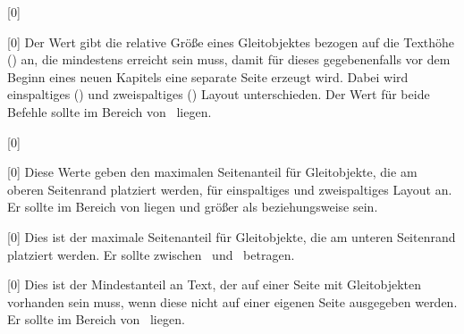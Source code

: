 \begin{Declaration}{}[0\floatpagefraction]
\begin{Declaration}{}[0\dblfloatpagefraction]
\printdeclarationlist*%
%
Der Wert gibt die relative Größe eines Gleitobjektes bezogen auf die Texthöhe 
() an, die mindestens erreicht sein muss, damit für dieses 
gegebenenfalls vor dem Beginn eines neuen Kapitels eine separate Seite erzeugt 
wird. Dabei wird einspaltiges () und zweispaltiges 
() Layout unterschieden. Der Wert für beide 
Befehle sollte im Bereich von~ liegen.
\end{Declaration}
\end{Declaration}

\begin{Declaration}{}[0\topfraction]
\begin{Declaration}{}[0\dbltopfraction]
\printdeclarationlist*%
%
Diese Werte geben den maximalen Seitenanteil für Gleitobjekte, die am oberen 
Seitenrand platziert werden, für einspaltiges und zweispaltiges Layout an. Er 
sollte im Bereich von  liegen und größer als 
 beziehungsweise  sein.
\end{Declaration}
\end{Declaration}

\begin{Declaration}{}[0\bottomfraction]
\printdeclarationlist*%
%
Dies ist der maximale Seitenanteil für Gleitobjekte, die am unteren Seitenrand 
platziert werden. Er sollte zwischen~ und~ betragen.
\end{Declaration}

\begin{Declaration}{}[0\textfraction]
\printdeclarationlist*%
%
Dies ist der Mindestanteil an Text, der auf einer Seite mit Gleitobjekten 
vorhanden sein muss, wenn diese nicht auf einer eigenen Seite ausgegeben 
werden. Er sollte im Bereich von~ liegen.
\end{Declaration}

